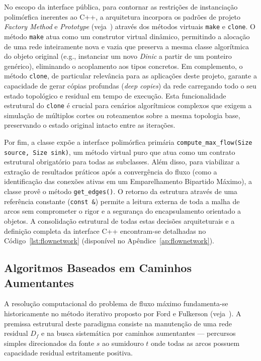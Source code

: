 \documentclass[12pt,a4paper]{article}
\begin{document}
No escopo da interface pública, para contornar as restrições de instanciação polimórfica inerentes ao C++, a arquitetura incorpora os padrões de projeto \textit{Factory Method} e \textit{Prototype} (veja~\cite{gamma1994design}) através dos métodos virtuais \lstinline{make} e \lstinline{clone}. O método \lstinline{make} atua como um construtor virtual dinâmico, permitindo a alocação de uma rede inteiramente nova e vazia que preserva a mesma classe algorítmica do objeto original (e.g., instanciar um novo \textit{Dinic} a partir de um ponteiro genérico), eliminando o acoplamento aos tipos concretos. Em complemento, o método \lstinline{clone}, de particular relevância para as aplicações deste projeto, garante a capacidade de gerar cópias profundas (\textit{deep copies}) da rede carregando todo o seu estado topológico e residual em tempo de execução. Esta funcionalidade estrutural do \lstinline{clone} é crucial para cenários algorítmicos complexos que exigem a simulação de múltiplos cortes ou roteamentos sobre a mesma topologia base, preservando o estado original intacto entre as iterações.

Por fim, a classe expõe a interface polimórfica primária \lstinline{compute_max_flow(Size source, Size sink)}, um método virtual puro que atua como um contrato estrutural obrigatório para todas as subclasses. Além disso, para viabilizar a extração de resultados práticos após a convergência do fluxo (como a identificação das conexões ativas em um Emparelhamento Bipartido Máximo), a classe provê o método \lstinline{get_edges()}. O retorno da estrutura através de uma referência constante (\lstinline{const &}) permite a leitura externa de toda a malha de arcos sem comprometer o rigor e a segurança do encapsulamento orientado a objetos. A consolidação estrutural de todas estas decisões arquiteturais e a definição completa da interface C++ encontram-se detalhadas no Código~\ref{lst:flownetwork} (disponível no Apêndice~\ref{ap:flownetwork}).

\subsection{Algoritmos Baseados em Caminhos Aumentantes}

A resolução computacional do problema de fluxo máximo fundamenta-se historicamente no método iterativo proposto por Ford e Fulkerson (veja~\cite{ford1956maximal}). A premissa estrutural deste paradigma consiste na manutenção de uma rede residual $D_f$ e na busca sistemática por caminhos aumentantes — percursos simples direcionados da fonte $s$ ao sumidouro $t$ onde todas as arcos possuem capacidade residual estritamente positiva.
\end{document}
